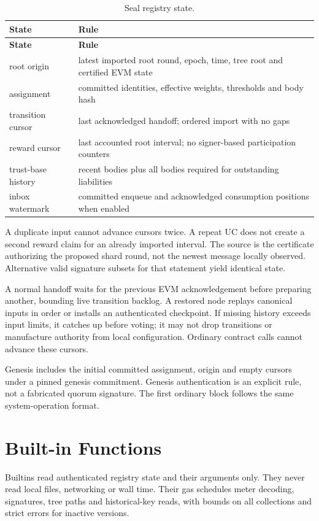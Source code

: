 \begin{longtable}{p{3.8cm}p{9.4cm}}
\caption{Seal registry state.}\label{ta:evm-seal-state}\\
\textbf{State} & \textbf{Rule}\\ \hline
\endfirsthead
\textbf{State} & \textbf{Rule}\\ \hline
\endhead
root origin & latest imported root round, epoch, time, tree root and certified EVM state\\
assignment & committed identities, effective weights, thresholds and body hash\\
transition cursor & last acknowledged handoff; ordered import with no gaps\\
reward cursor & last accounted root interval; no signer-based participation counters\\
trust-base history & recent bodies plus all bodies required for outstanding liabilities\\
inbox watermark & committed enqueue and acknowledged consumption positions when enabled\\
\end{longtable}

A duplicate input cannot advance cursors twice. A repeat UC does not create a second reward claim for an already imported interval. The source is the certificate authorizing the proposed shard round, not the newest message locally observed. Alternative valid signature subsets for that statement yield identical state.

A normal handoff waits for the previous EVM acknowledgement before preparing another, bounding live transition backlog. A restored node replays canonical inputs in order or installs an authenticated checkpoint. If missing history exceeds input limits, it catches up before voting; it may not drop transitions or manufacture authority from local configuration. Ordinary contract calls cannot advance these cursors.

Genesis includes the initial committed assignment, origin and empty cursors under a pinned genesis commitment. Genesis authentication is an explicit rule, not a fabricated quorum signature. The first ordinary block follows the same system-operation format.

\section{Built-in Functions}\label{app:evm-builtins}

Builtins read authenticated registry state and their arguments only. They never read local files, networking or wall time. Their gas schedules meter decoding, signatures, tree paths and historical-key reads, with bounds on all collections and strict errors for inactive versions.


